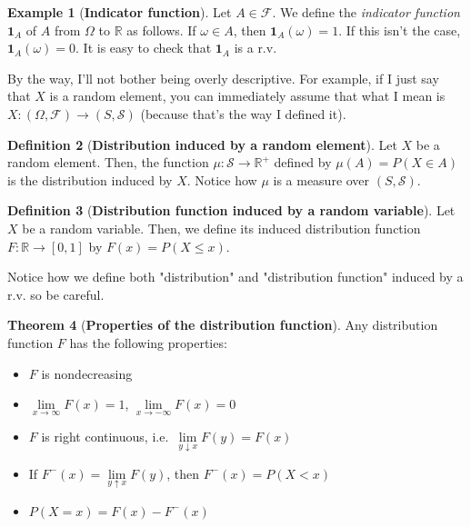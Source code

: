 \documentclass{article}
\theoremstyle{definition}
\newtheorem{theorem}{Theorem}[section]
\newtheorem{definition}[theorem]{Definition}
\newtheorem{example}[theorem]{Example}
\begin{document}
\begin{example}[\textbf{Indicator function}]
    Let $A \in \mathcal{F}$. We define the \emph{indicator function} $\mathbf{1}_{A}$ of $A$ from $\Omega$ to $\mathbb{R}$ as follows. If $\omega \in A$, then $\mathbf{1}_{A}(\omega) = 1$. If this isn't the case, $\mathbf{1}_{A}(\omega) = 0$. It is easy to check that $\mathbf{1}_{A}$ is a r.v.
\end{example}

By the way, I'll not bother being overly descriptive. For example, if I just say that $X$ is a random element, you can immediately assume that what I mean is $X : (\Omega, \mathcal{F}) \to (S, \mathcal{S})$ (because that's the way I defined it).


\begin{definition}[\textbf{Distribution induced by a random element}]
    Let $X$ be a random element. Then, the function $\mu : \mathcal{S} \to \mathbb{R}^+$ defined by $\mu(A) = P(X \in A)$ is the distribution induced by $X$. Notice how $\mu$ is a measure over $(S, \mathcal{S})$.
\end{definition}

\begin{definition}[\textbf{Distribution function induced by a random variable}]
    Let $X$ be a random variable. Then, we define its induced distribution function $F : \mathbb{R} \to [0, 1]$ by $F(x) = P(X \leq x)$.
\end{definition}

Notice how we define both "distribution" and "distribution function" induced by a r.v. so be careful.


\begin{theorem}[\textbf{Properties of the distribution function}]
    Any distribution function $F$ has the following properties:
    \begin{itemize}
        \item $F$ is nondecreasing
        \item $\lim\limits_{x \to \infty} F(x) = 1$, $\lim\limits_{x \to -\infty} F(x) = 0$
        \item $F$ is right continuous, i.e.\ $\lim\limits_{y \downarrow x} F(y) = F(x)$
        \item If $F^{-}(x) = \lim\limits_{y \uparrow x} F(y)$, then $F^{-}(x) = P(X < x)$
        \item $P(X=x) = F(x) - F^{-}(x)$
    \end{itemize}
\end{theorem}
\end{document}
